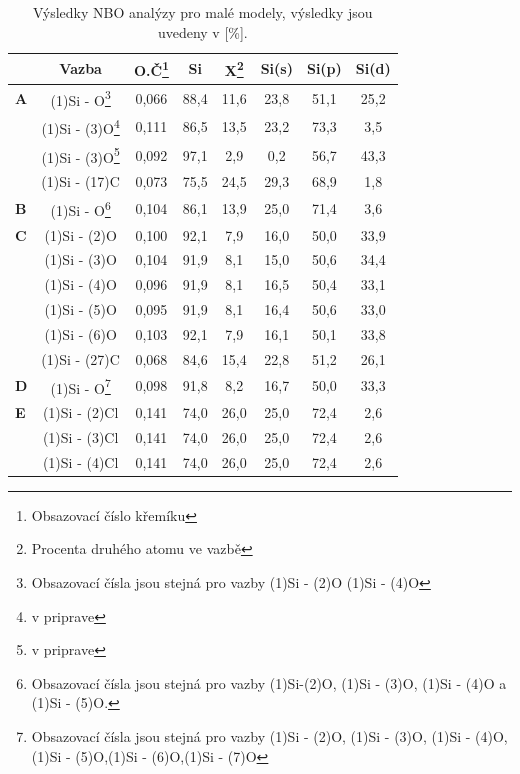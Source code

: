 \documentclass[
digital, %
table,   %
lof,     %
lot,     %
oneside,
]{fithesis3}
\begin{document}
\begin{table}[htbp]
\begin{minipage}{\textwidth}
\caption{Výsledky NBO analýzy pro malé modely, výsledky jsou uvedeny v [\%].}
\begin{center}
\begin{tabular}{|l|c|c|c|c|c|c|c|}
\hline
\label{nbo_small} &  Vazba & O.Č\footnote{Obsazovací číslo křemíku} & Si & X\footnote{Procenta druhého atomu ve  vazbě} & Si(s) & Si(p) &Si(d) \\ \hline
\textbf{A} & (1)Si - O\footnote{ Obsazovací čísla jsou stejná pro vazby (1)Si - (2)O (1)Si - (4)O}  & 0,066 & 88,4  & 11,6  & 23,8  & 51,1  & 25,2  \\ \hline
&  (1)Si - (3)O\footnote{v priprave} & 0,111 & 86,5  & 13,5  & 23,2  & 73,3  & 3,5  \\ \hline
&  (1)Si - (3)O\footnote{v priprave} & 0,092 & 97,1  & 2,9  & 0,2  & 56,7  & 43,3  \\ \hline
& (1)Si - (17)C & 0,073 & 75,5  & 24,5  & 29,3  & 68,9  & 1,8  \\ \hline
\textbf{B} & (1)Si - O\footnote{Obsazovací čísla jsou stejná pro vazby (1)Si-(2)O, (1)Si - (3)O, (1)Si - (4)O a (1)Si - (5)O.}  & 0,104 & 86,1  & 13,9  & 25,0  & 71,4  & 3,6  \\ \hline
\textbf{C} & (1)Si - (2)O  & 0,100 & 92,1  & 7,9  & 16,0  & 50,0  & 33,9  \\ \hline
& (1)Si - (3)O & 0,104 & 91,9  & 8,1  & 15,0  & 50,6  & 34,4  \\ \hline
&  (1)Si - (4)O& 0,096 & 91,9  & 8,1  & 16,5  & 50,4  & 33,1  \\ \hline
&  (1)Si - (5)O &0,095 & 91,9  & 8,1  & 16,4  & 50,6  & 33,0  \\ \hline
&  (1)Si - (6)O & 0,103 & 92,1  & 7,9  & 16,1  & 50,1  & 33,8  \\ \hline
& (1)Si - (27)C & 0,068 & 84,6  & 15,4  & 22,8  & 51,2  & 26,1  \\ \hline
\textbf{D} & (1)Si - O\footnote{Obsazovací čísla jsou stejná pro vazby (1)Si - (2)O, (1)Si - (3)O, (1)Si - (4)O, (1)Si - (5)O,(1)Si - (6)O,(1)Si - (7)O }  & 0,098 & 91,8  & 8,2  & 16,7  & 50,0  & 33,3  \\ \hline
\textbf{E} & (1)Si - (2)Cl & 0,141 & 74,0  & 26,0  & 25,0  & 72,4  & 2,6  \\ \hline
&  (1)Si - (3)Cl& 0,141 & 74,0  & 26,0  & 25,0  & 72,4  & 2,6  \\ \hline
& (1)Si - (4)Cl & 0,141 & 74,0  & 26,0  & 25,0  & 72,4  & 2,6  \\ \hline

\end{tabular}
\end{center}
\end{minipage}
\end{table}
\end{document}
